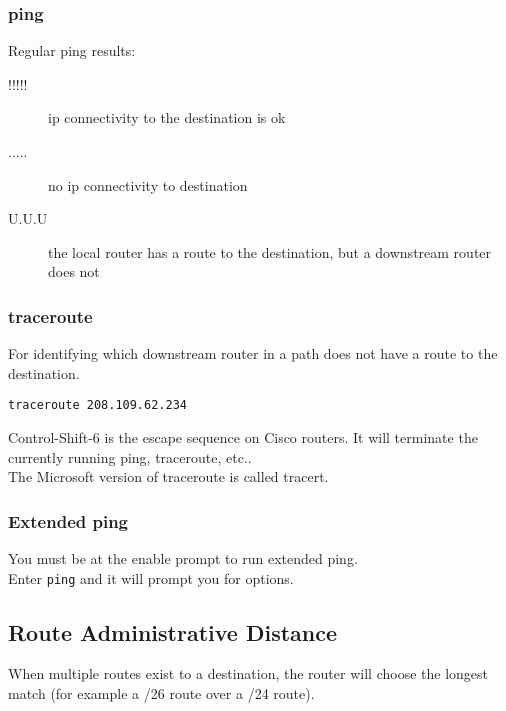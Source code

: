 \subsubsection{ping}

Regular ping results:

\begin{description}

\item[!!!!!]
ip connectivity to the destination is ok

\item[.....]
no ip connectivity to destination

\item[U.U.U]
the local router has a route to the destination, but a downstream router does
not

\end{description}

\subsubsection{traceroute}

For identifying which downstream router in a path does not have a route to
the destination.

\begin{verbatim}
traceroute 208.109.62.234
\end{verbatim}

Control-Shift-6 is the escape sequence on Cisco routers. It will terminate
the currently running ping, traceroute, etc..\\

The Microsoft version of traceroute is called tracert.

\subsubsection{Extended ping}

You must be at the enable prompt to run extended ping.\\

Enter \texttt{ping} and it will prompt you for options.

\subsection{Route Administrative Distance}

When multiple routes exist to a destination, the router will choose the
longest match (for example a /26 route over a /24 route).\\

